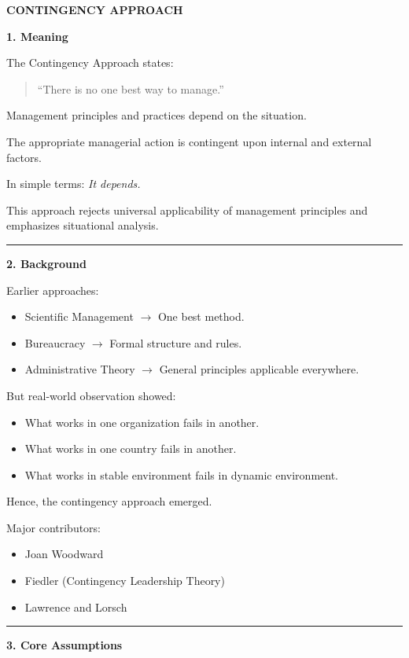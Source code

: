 \documentclass[10pt,a4paper]{article}
\newcommand{\separator}{\vspace{0.4em}\noindent\rule{\linewidth}{0.6pt}\vspace{0.4em}}
\begin{document}
\begin{center}
  \large\textbf{CONTINGENCY APPROACH}
\end{center}

\textbf{1. Meaning}

The Contingency Approach states:

\begin{quote}
``There is no one best way to manage.''
\end{quote}

Management principles and practices depend on the situation.

The appropriate managerial action is contingent upon internal and external factors.

In simple terms: \textit{It depends.}

This approach rejects universal applicability of management principles and emphasizes
situational analysis.

\separator

\textbf{2. Background}

Earlier approaches:
\begin{itemize}
  \item Scientific Management $\rightarrow$ One best method.
  \item Bureaucracy $\rightarrow$ Formal structure and rules.
  \item Administrative Theory $\rightarrow$ General principles applicable everywhere.
\end{itemize}

But real-world observation showed:
\begin{itemize}
  \item What works in one organization fails in another.
  \item What works in one country fails in another.
  \item What works in stable environment fails in dynamic environment.
\end{itemize}

Hence, the contingency approach emerged.

Major contributors:
\begin{itemize}
  \item Joan Woodward
  \item Fiedler (Contingency Leadership Theory)
  \item Lawrence and Lorsch
\end{itemize}

\separator

\textbf{3. Core Assumptions}
\end{document}
